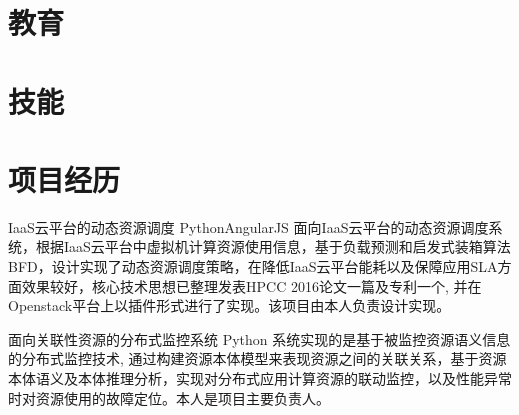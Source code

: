 \documentclass[11pt,a4paper]{moderncv}
\title{}               %
\begin{document}
\maketitle

\section{教育}


\section{技能}

\section{项目经历}
\renewcommand{\baselinestretch}{1.2}

{IaaS云平台的动态资源调度}
{Python}{AngularJS}{}
{面向IaaS云平台的动态资源调度系统，根据IaaS云平台中虚拟机计算资源使用信息，基于负载预测和启发式装箱算法BFD，设计实现了动态资源调度策略，在降低IaaS云平台能耗以及保障应用SLA方面效果较好，核心技术思想已整理发表HPCC 2016论文一篇及专利一个, 并在Openstack平台上以插件形式进行了实现。该项目由本人负责设计实现。}

\vspace*{0.2\baselineskip}
{面向关联性资源的分布式监控系统}
{Python}
{}{}
{系统实现的是基于被监控资源语义信息的分布式监控技术, 通过构建资源本体模型来表现资源之间的关联关系，基于资源本体语义及本体推理分析，实现对分布式应用计算资源的联动监控，以及性能异常时对资源使用的故障定位。本人是项目主要负责人。}
\end{document}
